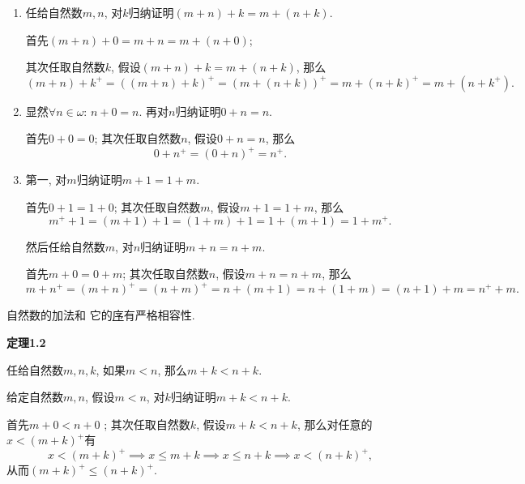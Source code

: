 \documentclass[UTF8]{ctexart}
\begin{document}
\begin{enumerate}
    \item 任给自然数$m,n$, 对$k$归纳证明$(m+n)+k=m+(n+k)$.
    
    \hspace{2.17em}
    首先$(m+n)+0=m+n=m+(n+0)$;
    
    \hspace{2.17em}
    其次任取自然数$k$, 假设$(m+n)+k=m+(n+k)$, 那么
    \[
        (m+n)+k^+=((m+n)+k)^+=(m+(n+k))^+=m+(n+k)^+=m+(n+k^+).
    \]

    \item 显然$\forall n\in\omega:\,n+0=n$. 再对$n$归纳证明$0+n=n$.
    
    \hspace{2.17em}
    首先$0+0=0$; 其次任取自然数$n$, 假设$0+n=n$, 那么
    \[
        0+n^+=(0+n)^+=n^+.
    \]

    \item 第一, 对$m$归纳证明$m+1=1+m$.
    
    \hspace{2.17em}
    首先$0+1=1+0$; 其次任取自然数$m$, 假设$m+1=1+m$, 那么
    \[
        m^++1=(m+1)+1=(1+m)+1=1+(m+1)=1+m^+.
    \]

    \hspace{2.17em}
    然后任给自然数$m$, 对$n$归纳证明$m+n=n+m$.

    \hspace{2.17em}
    首先$m+0=0+m$; 其次任取自然数$n$, 假设$m+n=n+m$, 那么
    \begin{equation*}
        m+n^+=(m+n)^+=(n+m)^+=n+(m+1)=n+(1+m)=(n+1)+m=n^++m.
    \tag*{\qedsymbol}\end{equation*}
\end{enumerate}





\newpage

自然数的加法和
它的\href{../01 自然数/03 自然数的序#nameddest=sec:定理1.4}{序}有严格相容性.

\vspace{10pt}

\hypertarget{sec:定理1.2}{}
\noindent\textbf{定理1.2}

任给自然数$m,n,k$, 如果$m<n$, 那么$m+k<n+k$.


给定自然数$m,n$, 假设$m<n$, 对$k$归纳证明$m+k<n+k$.

首先$m+0<n+0$ ; 其次任取自然数$k$, 假设$m+k<n+k$,
那么对任意的$x<(m+k)^+$有
\[
    x<(m+k)^+\implies x\leqslant m+k\implies
    x\leqslant n+k\implies x<(n+k)^+,
\]
从而$(m+k)^+\leqslant(n+k)^+$.
\end{document}
